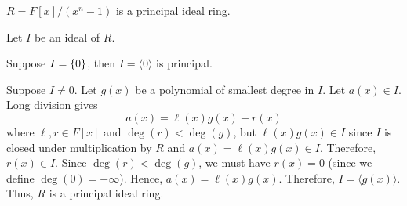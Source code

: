 \begin{Theorem}{}{}
    $ R=F[x]/(x^n-1) $ is a principal ideal ring.
\end{Theorem}

\begin{Proof}{}{}
    Let $ I $ be an ideal of $ R $.

    Suppose $ I=\{0\} $, then $ I=\langle 0\rangle $ is principal.

    Suppose $ I\neq 0 $. Let $ g(x) $ be a polynomial of smallest
    degree in $ I $. Let $ a(x)\in I $. Long division
    gives
    \[ a(x)=\ell(x)g(x)+r(x) \]
    where $ \ell,r\in F[x] $ and $ \deg(r)<\deg(g) $, but $ \ell(x)g(x)\in I $
    since $ I $ is closed under multiplication by $ R $ and
    $ a(x)=\ell(x)g(x)\in I $. Therefore, $ r(x)\in I $.
    Since $ \deg(r) <\deg(g) $, we must have $ r(x)=0 $ (since we define
    $ \deg(0)=-\infty $). Hence, $ a(x)=\ell(x)g(x) $. Therefore,
    $ I=\langle g(x) \rangle $. Thus, $ R $ is a principal ideal ring.
\end{Proof}
